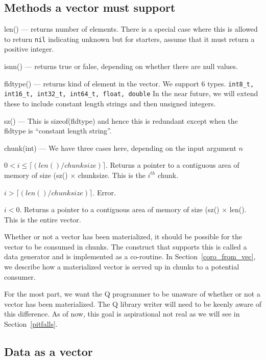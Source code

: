 \subsection{Methods a vector must support}

\be
\item len() --- returns number of elements. There is a special case where this
is allowed to return {\tt nil} indicating unknown but for starters, assume that it
must return a positive integer. 
\item isnn() --- returns true or false, depending on whether there are null values. 
\item fldtype() --- returns kind of element in the vector. 
We support 6 types.
{\tt int8\_t, int16\_t, int32\_t, int64\_t, float, double}
In the near  future, we will extend these to include constant length 
strings and then unsigned integers. 
\item sz() ---  This is sizeof(fldtype) and
hence this is redundant except when the fldtype is ``constant length
string''.
\item chunk(int) --- We have three cases here, depending on the input argument
\(n\)
\be
\item \(0 < i \leq \lceil(len()/chunksize)\rceil\). 
Returns a pointer to a contiguous area of memory of size (sz() \(\times\) chunksize. This is the \(i^{th}\) chunk.
\item \(i > \lceil(len()/chunksize)\rceil\). Error.
\item \(i < 0 \). 
Returns a pointer to a contiguous area of memory of size (sz() \(\times\) len(). This is the entire vector.
\ee
\ee


Whether or not a vector has been materialized, it should be possible for the
vector to be consumed in chunks. The construct that supports this is called a
data generator and is implemented as a co-routine. In
Section~\ref{coro_from_vec}, we describe how a materialized vector is served up
in chunks to a potential consumer.

For the most part, we want the Q programmer to be unaware of whether or not 
a vector has been materialized. The Q library writer will need to be keenly
aware of this difference. As of now, this goal is aspirational not real as we
will see in Section~\ref{pitfalls}.


\subsection{Data as a vector}
\label{data_vector}

